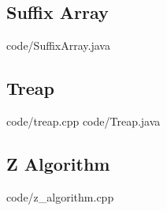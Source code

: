 \documentclass [landscape,10pt,a4paper,twocolumn,nofonts]{article}
\begin{document}
\subsection{Suffix Array}
 {code/SuffixArray.java}
\subsection{Treap}
 {code/treap.cpp}
 {code/Treap.java}
\subsection{Z Algorithm}
 {code/z_algorithm.cpp}
\newpage

\end{document}

